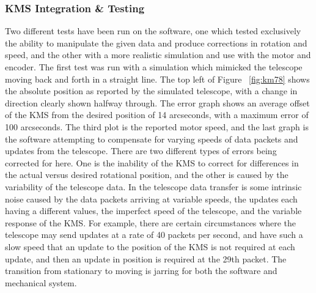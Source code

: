 \documentclass[manuscript]{aastex}
\begin{document}
\subsubsection{KMS Integration \& Testing}

Two different tests have been run on the software, one which tested exclusively the ability to manipulate the given data and produce corrections in rotation and speed, and the other with a more realistic simulation and use with the motor and encoder. The first test was run with a simulation which mimicked the telescope moving back and forth in a straight line. The top left of Figure ~\ref{fig:km78} shows the absolute position as reported by the simulated telescope, with a change in direction clearly shown halfway through. The error graph shows an average offset of the KMS from the desired position of 14 arcseconds, with a maximum error of 100 arcseconds. The third plot is the reported motor speed, and the last graph is the software attempting to compensate for varying speeds of data packets and updates from the telescope. There are two different types of errors being corrected for here. One is the inability of the KMS to correct for differences in the actual versus desired rotational position, and the other is caused by the variability of the telescope data. In the telescope data transfer is some intrinsic noise caused by the data packets arriving at variable speeds, the updates each having a different values, the imperfect speed of the telescope, and the variable response of the KMS. For example, there are certain circumstances where the telescope may send updates at a rate of 40 packets per second, and have such a slow speed that an update to the position of the KMS is not required at each update, and then an update in position is required at the 29th packet. The transition from stationary to moving is jarring for both the software and mechanical system. 
\end{document}
